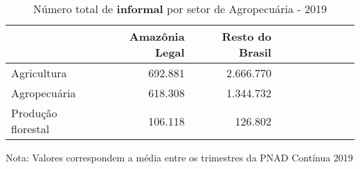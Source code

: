 \begin{table}[H]
\centering
\label{\_retrato\_emprego\_setor\_spap\_agricultura\_table\_n\_de\_informal}
\begin{threeparttable}
\caption{Número total de \textbf{informal} por setor de Agropecuária - 2019}
\begin{tabular}{l*{3}{rrr}}
\midrule \midrule
                    &Amazônia Legal&Resto do Brasil\\
\midrule
Agricultura         &     692.881&   2.666.770\\
Agropecuária       &     618.308&   1.344.732\\
Produção florestal&     106.118&     126.802\\
\bottomrule
\end{tabular}
\begin{tablenotes}
\scriptsize{Nota: Valores correspondem a média entre os trimestres da PNAD Contínua 2019}
\end{tablenotes}
\end{threeparttable}
\end{table}
